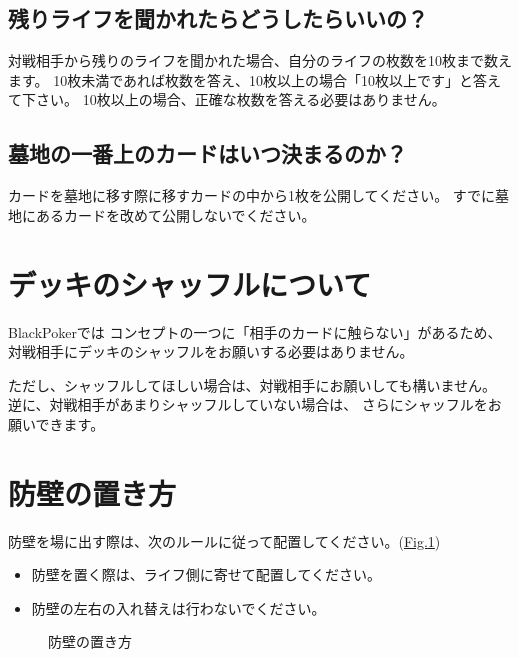 \documentclass[letterpaper,10pt,dvipdfmx]{sphinxmanual}
\begin{document}
\subsection{残りライフを聞かれたらどうしたらいいの？}
\label{\detokenize{common/common-etc:id3}}
\sphinxAtStartPar
対戦相手から残りのライフを聞かれた場合、自分のライフの枚数を10枚まで数えます。
10枚未満であれば枚数を答え、10枚以上の場合「10枚以上です」と答えて下さい。
10枚以上の場合、正確な枚数を答える必要はありません。


\subsection{墓地の一番上のカードはいつ決まるのか？}
\label{\detokenize{common/common-etc:id4}}
\sphinxAtStartPar
カードを墓地に移す際に移すカードの中から1枚を公開してください。
すでに墓地にあるカードを改めて公開しないでください。


\section{デッキのシャッフルについて}
\label{\detokenize{common/common-etc:id5}}
\sphinxAtStartPar
BlackPokerでは
コンセプトの一つに「相手のカードに触らない」があるため、
対戦相手にデッキのシャッフルをお願いする必要はありません。

\sphinxAtStartPar
ただし、シャッフルしてほしい場合は、対戦相手にお願いしても構いません。
逆に、対戦相手があまりシャッフルしていない場合は、
さらにシャッフルをお願いできます。


\section{防壁の置き方}
\label{\detokenize{common/common-etc:id6}}
\sphinxAtStartPar
防壁を場に出す際は、次のルールに従って配置してください。(\hyperref[\detokenize{common/common-etc:set-bulwork}]{Fig.\@ \ref{\detokenize{common/common-etc:set-bulwork}}})
\begin{itemize}
\item {} 
\sphinxAtStartPar
防壁を置く際は、ライフ側に寄せて配置してください。

\item {} 
\sphinxAtStartPar
防壁の左右の入れ替えは行わないでください。

\end{itemize}

\begin{figure}[htbp]
\centering
\capstart

\noindent{}
\caption{防壁の置き方}\label{\detokenize{common/common-etc:id9}}\label{\detokenize{common/common-etc:set-bulwork}}\end{figure}
\end{document}

